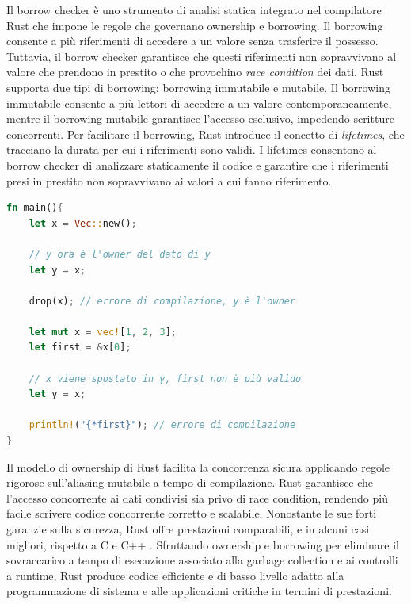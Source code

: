 Il borrow checker è uno strumento di analisi statica integrato nel compilatore Rust che impone le regole che governano ownership e borrowing. Il borrowing consente a più riferimenti di accedere a un valore senza trasferire il possesso. Tuttavia, il borrow checker garantisce che questi riferimenti non sopravvivano al valore che prendono in prestito o che provochino \textit{race condition} dei dati. Rust supporta due tipi di borrowing: borrowing immutabile e mutabile. Il borrowing immutabile consente a più lettori di accedere a un valore contemporaneamente, mentre il borrowing mutabile garantisce l'accesso esclusivo, impedendo scritture concorrenti. Per facilitare il borrowing, Rust introduce il concetto di \textit{lifetimes}, che tracciano la durata per cui i riferimenti sono validi. I lifetimes consentono al borrow checker di analizzare staticamente il codice e garantire che i riferimenti presi in prestito non sopravvivano ai valori a cui fanno riferimento.

\newpage
\vspace{5mm}
\begin{lstlisting}[language=Rust, caption=Controllo dei puntatori in fase di compilazione, label=lis:rust_borrow_checker]
fn main(){
    let x = Vec::new();

    // y ora è l'owner del dato di y
    let y = x;

    drop(x); // errore di compilazione, y è l'owner

    let mut x = vec![1, 2, 3];
    let first = &x[0];

    // x viene spostato in y, first non è più valido
    let y = x;

    println!("{*first}"); // errore di compilazione
}
\end{lstlisting}
\vspace{5mm}

Il modello di ownership di Rust facilita la concorrenza sicura applicando regole rigorose sull'aliasing mutabile a tempo di compilazione. Rust garantisce che l'accesso concorrente ai dati condivisi sia privo di race condition, rendendo più facile scrivere codice concorrente corretto e scalabile.
Nonostante le sue forti garanzie sulla sicurezza, Rust offre prestazioni comparabili, e in alcuni casi migliori, rispetto a C e C++ \cite[]{Rust:bench}. Sfruttando ownership e borrowing per eliminare il sovraccarico a tempo di esecuzione associato alla garbage collection e ai controlli a runtime, Rust produce codice efficiente e di basso livello adatto alla programmazione di sistema e alle applicazioni critiche in termini di prestazioni.

